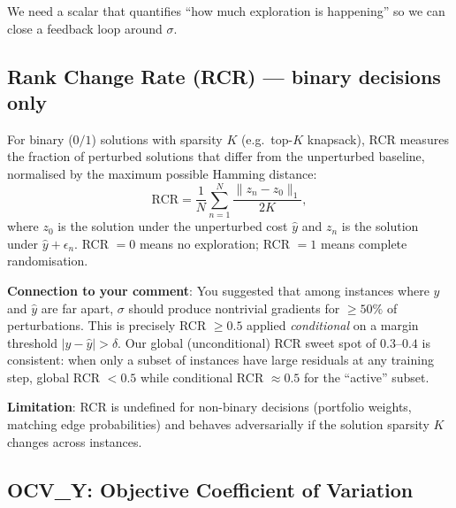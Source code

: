 \documentclass[11pt]{article}
\begin{document}
We need a scalar that quantifies ``how much exploration is happening''
so we can close a feedback loop around $\sigma$.

\subsection{Rank Change Rate (RCR) --- binary decisions only}

For binary ($0/1$) solutions with sparsity $K$ (e.g.\ top-$K$ knapsack),
RCR measures the fraction of perturbed solutions that differ from the
unperturbed baseline, normalised by the maximum possible Hamming distance:
\begin{equation}
  \mathrm{RCR} = \frac{1}{N} \sum_{n=1}^{N}
    \frac{\|z_n - z_0\|_1}{2K},
  \label{eq:rcr}
\end{equation}
where $z_0$ is the solution under the unperturbed cost $\hat{y}$ and
$z_n$ is the solution under $\hat{y} + \epsilon_n$.
RCR $= 0$ means no exploration; RCR $= 1$ means complete randomisation.

\textbf{Connection to your comment}: You suggested that among instances
where $y$ and $\hat{y}$ are far apart, $\sigma$ should produce nontrivial
gradients for $\geq 50\%$ of perturbations.  This is precisely RCR
$\geq 0.5$ applied \emph{conditional} on a margin threshold $|y - \hat{y}|
> \delta$.  Our global (unconditional) RCR sweet spot of $0.3$--$0.4$ is
consistent: when only a subset of instances have large residuals at any
training step, global RCR $< 0.5$ while conditional RCR $\approx 0.5$ for
the ``active'' subset.

\textbf{Limitation}: RCR is undefined for non-binary decisions
(portfolio weights, matching edge probabilities) and behaves adversarially
if the solution sparsity $K$ changes across instances.

\subsection{OCV\_Y: Objective Coefficient of Variation}
\end{document}
